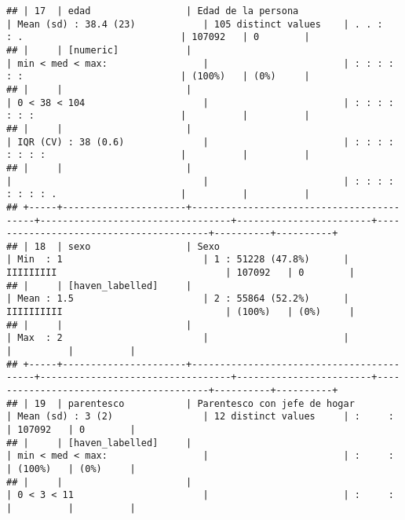 \documentclass[]{article}
\begin{document}
\begin{verbatim}
## | 17  | edad                 | Edad de la persona                       | Mean (sd) : 38.4 (23)            | 105 distinct values    | . . :   : .                            | 107092   | 0        |
## |     | [numeric]            |                                          | min < med < max:                 |                        | : : : : : :                            | (100%)   | (0%)     |
## |     |                      |                                          | 0 < 38 < 104                     |                        | : : : : : : :                          |          |          |
## |     |                      |                                          | IQR (CV) : 38 (0.6)              |                        | : : : : : : : :                        |          |          |
## |     |                      |                                          |                                  |                        | : : : : : : : : .                      |          |          |
## +-----+----------------------+------------------------------------------+----------------------------------+------------------------+----------------------------------------+----------+----------+
## | 18  | sexo                 | Sexo                                     | Min  : 1                         | 1 : 51228 (47.8%)      | IIIIIIIII                              | 107092   | 0        |
## |     | [haven_labelled]     |                                          | Mean : 1.5                       | 2 : 55864 (52.2%)      | IIIIIIIIII                             | (100%)   | (0%)     |
## |     |                      |                                          | Max  : 2                         |                        |                                        |          |          |
## +-----+----------------------+------------------------------------------+----------------------------------+------------------------+----------------------------------------+----------+----------+
## | 19  | parentesco           | Parentesco con jefe de hogar             | Mean (sd) : 3 (2)                | 12 distinct values     | :     :                                | 107092   | 0        |
## |     | [haven_labelled]     |                                          | min < med < max:                 |                        | :     :                                | (100%)   | (0%)     |
## |     |                      |                                          | 0 < 3 < 11                       |                        | :     :                                |          |          |

\end{verbatim}
\end{document}
